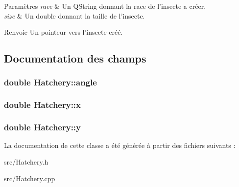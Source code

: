 \begin{DoxyParams}{Paramètres}
{\em race} & Un QString donnant la race de l'insecte a créer. \\
\hline
{\em size} & Un double donnant la taille de l'insecte. \\
\hline
\end{DoxyParams}
\begin{DoxyReturn}{Renvoie}
Un pointeur vers l'insecte créé. 
\end{DoxyReturn}


\subsection{Documentation des champs}
\hypertarget{classHatchery_a4e56c9314b9a9dfe1718d43e30f3d4d0}{
\subsubsection[{angle}]{\setlength{\rightskip}{0pt plus 5cm}double {\bf Hatchery::angle}}}
\label{classHatchery_a4e56c9314b9a9dfe1718d43e30f3d4d0}
\hypertarget{classHatchery_ae56bf748a2046b42e2b174c17e4caeda}{
\subsubsection[{x}]{\setlength{\rightskip}{0pt plus 5cm}double {\bf Hatchery::x}}}
\label{classHatchery_ae56bf748a2046b42e2b174c17e4caeda}
\hypertarget{classHatchery_a99f0ef4a290d0bc1e65976b5979b29b7}{
\subsubsection[{y}]{\setlength{\rightskip}{0pt plus 5cm}double {\bf Hatchery::y}}}
\label{classHatchery_a99f0ef4a290d0bc1e65976b5979b29b7}


La documentation de cette classe a été générée à partir des fichiers suivants :\begin{DoxyCompactItemize}
\item 
src/Hatchery.h\item 
src/Hatchery.cpp\end{DoxyCompactItemize}
